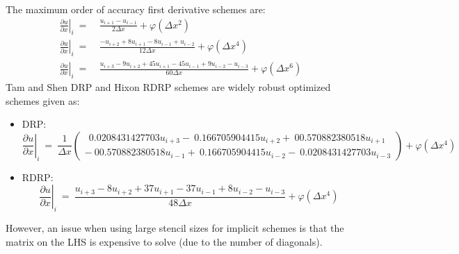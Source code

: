 \documentclass[conf]{new-aiaa}
\begin{document}
\noindent
The maximum order of accuracy first derivative schemes are:
\begin{equation*}
	\begin{split}
		\left.\frac{\partial{u}}{\partial{x}}\right|_{i}~=&~\frac{u_{i+1}-u_{i-1}}{2\Delta{x}} +\varphi\left(\Delta{x^2}\right) \\
		\left.\frac{\partial{u}}{\partial{x}}\right|_{i}~=&~\frac{-u_{i+2}+8u_{i+1}-8u_{i-1}+u_{i-2}}{12\Delta{x}}  +\varphi\left(\Delta{x^4}\right) \\
		\left.\frac{\partial{u}}{\partial{x}}\right|_{i}~=&~\frac{u_{i+3}-9u_{i+2}+45u_{i+1}-45u_{i-1}+9u_{i-2}-u_{i-3}}{60\Delta{x}}  +\varphi\left(\Delta{x^6}\right) 
	\end{split}
\end{equation*}
Tam and Shen DRP \cite{DRP} and Hixon RDRP \cite{RDRP} schemes are widely robust optimized schemes given as:
\begin{itemize}
	\item DRP:
		\begin{equation*}
			\left.\frac{\partial{u}}{\partial{x}}\right|_{i}~=~\frac{1}{\Delta{x}}
				\left(\begin{matrix} 	
					~~0.0208431427703u_{i+3} 
					-~0.166705904415u_{i+2}  
					+~00.570882380518u_{i+1}  \\
					-~00.570882380518u_{i-1}  
					+~0.166705904415u_{i-2}  
					-~0.0208431427703u_{i-3}
				\end{matrix}
				\right)+\varphi\left(\Delta{x^4}\right) 
		\end{equation*}
	\item RDRP:
		\begin{equation*}
			\left.\frac{\partial{u}}{\partial{x}}\right|_{i}~=~\frac{u_{i+3}-8u_{i+2}+37u_{i+1}-37u_{i-1}+8u_{i-2}-u_{i-3}}{48\Delta{x}}+\varphi\left(\Delta{x^4}\right) 
		\end{equation*}
\end{itemize}
However, an issue when using large stencil sizes for implicit schemes is that the matrix on the LHS is expensive to solve (due to the number of diagonals). 
\end{document}

